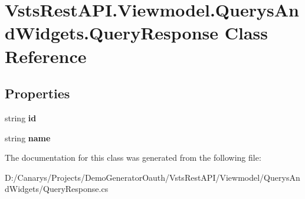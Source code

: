 \hypertarget{class_vsts_rest_a_p_i_1_1_viewmodel_1_1_querys_and_widgets_1_1_query_response}{}\section{Vsts\+Rest\+A\+P\+I.\+Viewmodel.\+Querys\+And\+Widgets.\+Query\+Response Class Reference}
\label{class_vsts_rest_a_p_i_1_1_viewmodel_1_1_querys_and_widgets_1_1_query_response}
\subsection*{Properties}
\begin{DoxyCompactItemize}
\item 
\mbox{\label{class_vsts_rest_a_p_i_1_1_viewmodel_1_1_querys_and_widgets_1_1_query_response_ae3ded70cb703583f41a46ec9904a49de}} 
string {\bfseries id}
\item 
\mbox{\label{class_vsts_rest_a_p_i_1_1_viewmodel_1_1_querys_and_widgets_1_1_query_response_a549a257b3bd977f12af645953d87aa3d}} 
string {\bfseries name}
\end{DoxyCompactItemize}


The documentation for this class was generated from the following file\+:\begin{DoxyCompactItemize}
\item 
D\+:/\+Canarys/\+Projects/\+Demo\+Generator\+Oauth/\+Vsts\+Rest\+A\+P\+I/\+Viewmodel/\+Querys\+And\+Widgets/Query\+Response.\+cs\end{DoxyCompactItemize}
